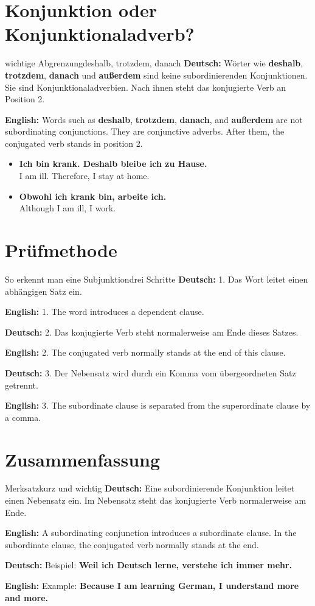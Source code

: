 \documentclass[a4paper,11pt]{article}
\newcommand{\GermanText}[1]{\textbf{Deutsch: }#1\par}
\newcommand{\EnglishText}[1]{{\small\color{SoftGray}\textbf{English: }#1\par}}
\newcommand{\ExampleItem}[2]{\item \textbf{#1}\\{\small\color{SoftGray}#2}}
\begin{document}
\section{Konjunktion oder Konjunktionaladverb?}

\begin{grammarentry}{wichtige Abgrenzung}{deshalb, trotzdem, danach}
\GermanText{Wörter wie \textbf{deshalb}, \textbf{trotzdem}, \textbf{danach} und \textbf{außerdem} sind keine subordinierenden Konjunktionen. Sie sind Konjunktionaladverbien. Nach ihnen steht das konjugierte Verb an Position 2.}
\EnglishText{Words such as \textbf{deshalb}, \textbf{trotzdem}, \textbf{danach}, and \textbf{außerdem} are not subordinating conjunctions. They are conjunctive adverbs. After them, the conjugated verb stands in position 2.}
\end{grammarentry}

\begin{exbox}
\begin{itemize}
\ExampleItem{Ich bin krank. Deshalb bleibe ich zu Hause.}{I am ill. Therefore, I stay at home.}
\ExampleItem{Obwohl ich krank bin, arbeite ich.}{Although I am ill, I work.}
\end{itemize}
\end{exbox}

\section{Prüfmethode}

\begin{grammarentry}{So erkennt man eine Subjunktion}{drei Schritte}
\GermanText{1. Das Wort leitet einen abhängigen Satz ein.}
\EnglishText{1. The word introduces a dependent clause.}

\GermanText{2. Das konjugierte Verb steht normalerweise am Ende dieses Satzes.}
\EnglishText{2. The conjugated verb normally stands at the end of this clause.}

\GermanText{3. Der Nebensatz wird durch ein Komma vom übergeordneten Satz getrennt.}
\EnglishText{3. The subordinate clause is separated from the superordinate clause by a comma.}
\end{grammarentry}

\section{Zusammenfassung}

\begin{grammarentry}{Merksatz}{kurz und wichtig}
\GermanText{Eine subordinierende Konjunktion leitet einen Nebensatz ein. Im Nebensatz steht das konjugierte Verb normalerweise am Ende.}
\EnglishText{A subordinating conjunction introduces a subordinate clause. In the subordinate clause, the conjugated verb normally stands at the end.}

\GermanText{Beispiel: \textbf{Weil ich Deutsch lerne, verstehe ich immer mehr.}}
\EnglishText{Example: \textbf{Because I am learning German, I understand more and more.}}
\end{grammarentry}
\end{document}
